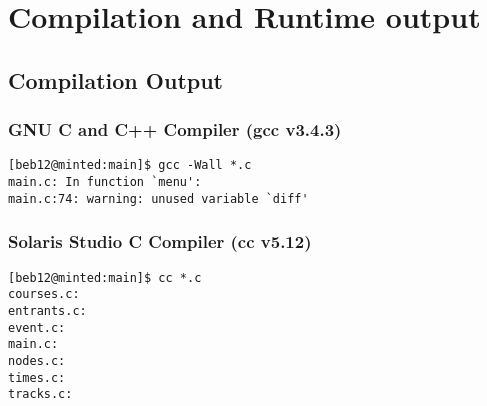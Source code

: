 \documentclass[pdftex,12pt,a4paper]{article}
\begin{document}
\section{Compilation and Runtime output}
\subsection{Compilation Output}
\subsubsection{GNU C and C++ Compiler (gcc v3.4.3)}
\begin{verbatim}
[beb12@minted:main]$ gcc -Wall *.c
main.c: In function `menu':
main.c:74: warning: unused variable `diff'
\end{verbatim}
\subsubsection{Solaris Studio C Compiler (cc v5.12)}
\begin{verbatim}
[beb12@minted:main]$ cc *.c
courses.c:
entrants.c:
event.c:
main.c:
nodes.c:
times.c:
tracks.c:
\end{verbatim}
\end{document}
